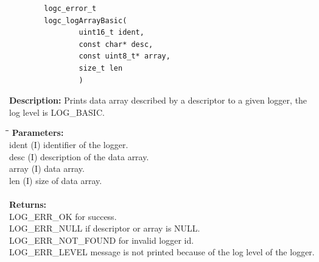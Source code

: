 \documentclass[a4paper, titlepage, 11pt]{article}
\begin{document}
\small
\begin{verbatim}
        logc_error_t
        logc_logArrayBasic(
                uint16_t ident,
                const char* desc,
                const uint8_t* array,
                size_t len
                )
\end{verbatim}
\normalsize
\textbf{Description:} Prints data array described by a descriptor to a given logger, the log level is LOG\_BASIC.
\begin{tabbing}
\hspace*{1cm}\=\hspace*{2cm}\=\hspace*{0,6cm}\= \kill
\textbf{Parameters:} \\
\> ident \> (I) identifier of the logger. \\
\> desc \> (I) description of the data array. \\
\> array \> (I) data array. \\
\> len \> (I) size of data array. \\ \\
\textbf{Returns:} \\
\> LOG\_ERR\_OK for success. \\
\> LOG\_ERR\_NULL if descriptor or array is NULL. \\
\> LOG\_ERR\_NOT\_FOUND for invalid logger id. \\
\> LOG\_ERR\_LEVEL message is not printed because of the log level of the logger. \\
\end{tabbing}

\newpage
\end{document}

